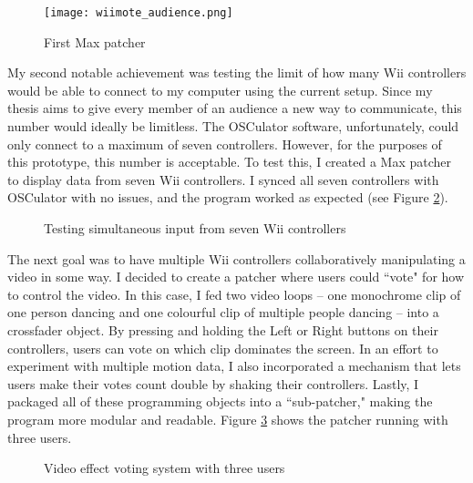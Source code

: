 \begin{figure}[t]
	\centering

	\texttt{[image: wiimote\_audience.png]}
	\caption{First Max patcher}

	\label{prototyping2}
\end{figure}

My second notable achievement was testing the limit of how many Wii controllers would be able to connect to my computer using the current setup. Since my thesis aims to give every member of an audience a new way to communicate, this number would ideally be limitless. The OSCulator software, unfortunately, could only connect to a maximum of seven controllers. However, for the purposes of this prototype, this number is acceptable. To test this, I created a Max patcher to display data from seven Wii controllers. I synced all seven controllers with OSCulator with no issues, and the program worked as expected (see Figure \ref{prototyping3}).

\begin{figure}[t]
	\centering

	\hspace{0.1cm}
	\caption{Testing simultaneous input from seven Wii controllers}

	\label{prototyping3}
\end{figure}

The next goal was to have multiple Wii controllers collaboratively manipulating a video in some way. I decided to create a patcher where users could ``vote" for how to control the video. In this case, I fed two video loops -- one monochrome clip of one person dancing and one colourful clip of multiple people dancing -- into a crossfader object. By pressing and holding the Left or Right buttons on their controllers, users can vote on which clip dominates the screen. In an effort to experiment with multiple motion data, I also incorporated a mechanism that lets users make their votes count double by shaking their controllers. Lastly, I packaged all of these programming objects into a ``sub-patcher," making the program more modular and readable. Figure \ref{prototyping4} shows the patcher running with three users.

\begin{figure}[t]
	\centering

	\hspace{1cm}
	\caption{Video effect voting system with three users}

	\label{prototyping4}
\end{figure}

